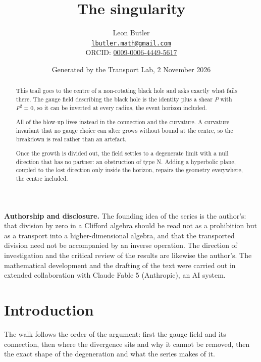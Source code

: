 \documentclass[11pt]{article}
\title{\bfseries The singularity}
\author{Leon Butler\\ \normalsize\href{mailto:lbutler.math@gmail.com}{\texttt{lbutler.math@gmail.com}}\\ \normalsize ORCID: \href{https://orcid.org/0009-0006-4449-5617}{0009-0006-4449-5617}}
\date{Generated by the Transport Lab, 2 November 2026}
\theoremstyle{definition}
\theoremstyle{plain}
\begin{document}
\maketitle
\begin{abstract}
\normalsize
This trail goes to the centre of a non-rotating black hole and asks exactly what fails there. The gauge field describing the black hole is the identity plus a shear $P$ with $P^2 = 0$, so it can be inverted at every radius, the event horizon included.

All of the blow-up lives instead in the connection and the curvature. A curvature invariant that no gauge choice can alter grows without bound at the centre, so the breakdown is real rather than an artefact.

Once the growth is divided out, the field settles to a degenerate limit with a null direction that has no partner: an obstruction of type N. Adding a hyperbolic plane, coupled to the lost direction only inside the horizon, repairs the geometry everywhere, the centre included.
\end{abstract}
\newpage
\noindent \textbf{Authorship and disclosure. }The founding idea of the series is the author's: that division by zero in a Clifford algebra should be read not as a prohibition but as a transport into a higher-dimensional algebra, and that the transported division need not be accompanied by an inverse operation. The direction of investigation and the critical review of the results are likewise the author's. The mathematical development and the drafting of the text were carried out in extended collaboration with Claude Fable 5 (Anthropic), an AI system.

\noindent{}
\newpage

\section*{Introduction}
The walk follows the order of the argument: first the gauge field and its connection, then where the divergence sits and why it cannot be removed, then the exact shape of the degeneration and what the series makes of it.
\end{document}
